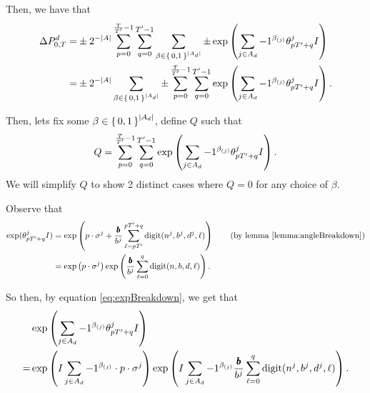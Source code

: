 Then, we have that
\begin{align*}
 \Delta P_{0, T}^d =&
  \pm 2^{-|A|} \sum_{p= 0}^{\frac{T}{{T}'} - 1} \sum_{q = 0}^{{T}' - 1}
 \sum_{\beta \in \set{0,1}^{|A_d|}} 
 	 \pm
    \exp\left(
        \sum_{j \in A_d} -1 ^ {\beta_{(j)}}
        {\theta^j_{p {T}' + q}}I
      \right)\\
 =&
  \pm 2^{-|A|} 
 \sum_{\beta \in \set{0,1}^{|A_d|}} 
		\pm
     \sum_{p= 0}^{\frac{T}{{T}'} - 1} \sum_{q = 0}^{{T}' - 1}
    \exp\left(
        \sum_{j \in A_d} -1 ^ {\beta_{(j)}}
        {\theta^j_{p {T}' + q}}I
      \right).
\end{align*}

\newcommand{\eqWTSInnerProd}{
  \sum_{p= 0}^{\frac{\totalPeriod}{\rationalPeriodTotal} - 1} \sum_{q = 0}^{\rationalPeriodTotal - 1}
    \exp\left(
        \sum_{j \in A_d} -1 ^ {\beta_{(j)}}
        \rationalAngle{p \rationalPeriodTotal + q}I
      \right)}

Then, lets fix some $\beta \in \set{0, 1}^{|A_d|}$, define $Q$ such that
\begin{equation}
\label{eq:wts01}  
  Q = \eqWTSInnerProd.
\end{equation}
We will simplify $Q$ to show 2 distinct cases where $Q = 0$ for any choice of $\beta$.

Observe that 
\begin{align}
  \exp(\rationalAngle{p \rationalPeriodTotal + q}I)
  &= \exp\left(p \cdot \digSumPeriodic +
    \numbToCommon \sum_{\ell = p \rationalPeriodTotal}^{p \rationalPeriodTotal + q}\mathrm{digit}(n^j, b^j, d^j, \ell)\right) \tag{by lemma \ref{lemma:angleBreakdown}} \\
    \label{eq:expBreakdown}
    &= \exp\left(p \cdot \digSumPeriodic\right) \exp\left(\numbToCommon \sum_{\ell = 0}^{q}\mathrm{digit}(n, b, d, \ell)\right).
\end{align}

So then, by equation \eqref{eq:expBreakdown}, we get that
\begin{align}
&\exp\left(
    \sum_{j \in A_d} -1 ^ {\beta_{(j)}}
    {\theta^j_{p {T}' + q}}I
\right)\notag \\ 
\label{eq:decomposeExp}
=&
\exp\left(
    I \sum_{j \in A_d} -1 ^ {\beta_{(j)}}
    \cdot p \cdot
    \sigma^j
\right)
\exp\left(
    I \sum_{j \in A_d} -1 ^ {\beta_{(j)}} \frac{{\pmb{b}}}{b^j}
      \sum_{\ell = 0}^{q}\mathrm{digit}(n^j, b^j, d^j, \ell)
\right).
\end{align}

